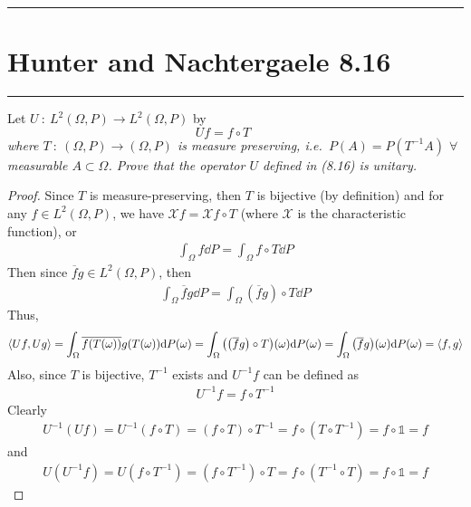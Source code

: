 \documentclass{article} %
\theoremstyle{plain}
\newcommand{\VEC}[2]{\left\langle #1, #2 \right\rangle}
\newcommand{\problem}[1]{
\vspace{.375cm}
\begin{minipage}{\textwidth}
    \begin{center}
        \noindent\rule{5cm}{1pt}
    \end{center}
    \section{\bf #1}
    \begin{center}
        \noindent\rule{5cm}{1pt}
    \end{center}
    \vspace{0.25cm}
\end{minipage}
}
\numberwithin{equation}{section} %
\numberwithin{figure}{section} %
\numberwithin{table}{section} %
\begin{document}
\problem{Hunter and Nachtergaele 8.16}
Let $U\ :\ L^2(\Omega, P) \rightarrow L^2(\Omega, P)$ by
\begin{equation}
    \tag{8.16}
    Uf = f \circ T \qquad
\end{equation}
\emph{where $T\ :\ (\Omega, P) \rightarrow (\Omega, P)$ is measure preserving, i.e.~$P(A) = P(T^{-1}A)$ $\forall$ measurable $A \subset \Omega$.  Prove that the operator $U$ defined in (8.16) is unitary.}

\begin{proof}
    Since $T$ is measure-preserving, then $T$ is bijective (by definition) and for any $f \in L^2(\Omega, P)$, we have $\mathcal{X}f = \mathcal{X}f \circ T$ (where $\mathcal{X}$ is the characteristic function), or
    \begin{align*}
        \int_\Omega f \dd P = \int_\Omega f \circ T \dd P
    \end{align*}
    Then since $\overline{f}g \in L^2(\Omega, P)$, then
    \begin{align*}
        \int_\Omega \overline{f}g \dd P = \int_\Omega (\overline{f}g) \circ T \dd P
    \end{align*}
    Thus,
    \begin{align*}
        \VEC{Uf}{Ug} = \int_\Omega \overline{f\qty(T\qty(\omega))}g\qty(T\qty(\omega))\dd P\qty(\omega) = \int_\Omega \qty(\qty(\overline{f}g) \circ T)(\omega) \dd P\qty(\omega) = \int_\Omega \qty(\overline{f}g)(\omega) \dd P\qty(\omega) = \VEC{f}{g}
    \end{align*}
    Also, since $T$ is bijective, $T^{-1}$ exists and $U^{-1}f$ can be defined as
    \begin{align*}
        U^{-1}f = f \circ T^{-1}
    \end{align*}
    Clearly
    \begin{align*}
        U^{-1}(Uf) = U^{-1}(f \circ T) = (f \circ T) \circ T^{-1} = f \circ (T \circ T^{-1}) = f \circ \mathbb{1} = f
    \end{align*}
    and
    \begin{align*}
        U(U^{-1}f) = U(f \circ T^{-1}) = (f \circ T^{-1}) \circ T = f \circ (T^{-1} \circ T) = f \circ \mathbb{1} = f
    \end{align*}
\end{proof}
\end{document}
